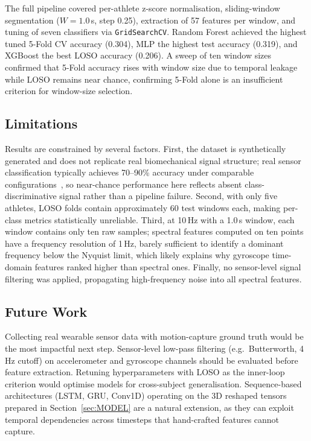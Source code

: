 \documentclass[12pt,a4paper]{cibb}
\begin{document}
The full pipeline covered per-athlete z-score normalisation, sliding-window segmentation ($W=1.0$\,s, step 0.25), extraction of 57 features per window, and tuning of seven classifiers via \texttt{GridSearchCV}. Random Forest achieved the highest tuned 5-Fold CV accuracy (0.304), MLP the highest test accuracy (0.319), and XGBoost the best LOSO accuracy (0.206). A sweep of ten window sizes confirmed that 5-Fold accuracy rises with window size due to temporal leakage while LOSO remains near chance, confirming 5-Fold alone is an insufficient criterion for window-size selection.

\subsection{Limitations}
Results are constrained by several factors. First, the dataset is synthetically generated and does not replicate real biomechanical signal structure; real sensor classification typically achieves 70--90\% accuracy under comparable configurations~\cite{Vitali2020}, so near-chance performance here reflects absent class-discriminative signal rather than a pipeline failure. Second, with only five athletes, LOSO folds contain approximately 60 test windows each, making per-class metrics statistically unreliable. Third, at 10\,Hz with a 1.0\,s window, each window contains only ten raw samples; spectral features computed on ten points have a frequency resolution of 1\,Hz, barely sufficient to identify a dominant frequency below the Nyquist limit, which likely explains why gyroscope time-domain features ranked higher than spectral ones. Finally, no sensor-level signal filtering was applied, propagating high-frequency noise into all spectral features.

\subsection{Future Work}
Collecting real wearable sensor data with motion-capture ground truth would be the most impactful next step. Sensor-level low-pass filtering (e.g.\ Butterworth, 4\,Hz cutoff) on accelerometer and gyroscope channels should be evaluated before feature extraction. Retuning hyperparameters with LOSO as the inner-loop criterion would optimise models for cross-subject generalisation. Sequence-based architectures (LSTM, GRU, Conv1D) operating on the 3D reshaped tensors prepared in Section~\ref{sec:MODEL} are a natural extension, as they can exploit temporal dependencies across timesteps that hand-crafted features cannot capture.
\end{document}
